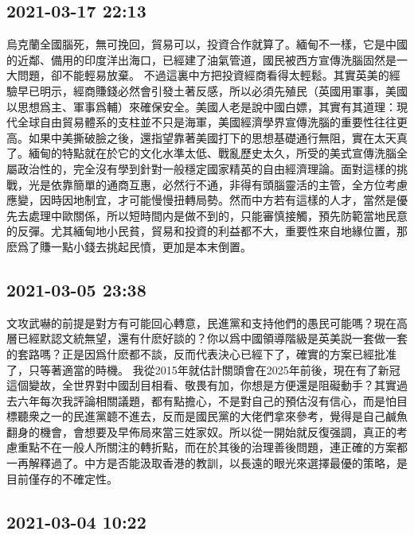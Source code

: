 \documentclass[twocolumn]{ctexart}
\begin{document}
\subsection*{2021-03-17 22:13}

烏克蘭全國腦死，無可挽回，貿易可以，投資合作就算了。緬甸不一樣，它是中國的近鄰、備用的印度洋出海口，已經建了油氣管道，國民被西方宣傳洗腦固然是一大問題，卻不能輕易放棄。
不過這裏中方把投資經商看得太輕鬆。其實英美的經驗早已明示，經商賺錢必然會引發土著反感，所以必須先殖民（英國用軍事，美國以思想爲主、軍事爲輔）來確保安全。美國人老是說中國白嫖，其實有其道理：現代全球自由貿易體系的支柱並不只是海軍，美國經濟學界宣傳洗腦的重要性往往更高。如果中美撕破臉之後，還指望靠著美國打下的思想基礎通行無阻，實在太天真了。緬甸的特點就在於它的文化水準太低、戰亂歷史太久，所受的美式宣傳洗腦全屬政治性的，完全沒有學到針對一般穩定國家精英的自由經濟理論。面對這樣的挑戰，光是依靠簡單的通商互惠，必然行不通，非得有頭腦靈活的主管，全方位考慮應變，因時因地制宜，才可能慢慢扭轉局勢。然而中方若有這樣的人才，當然是優先去處理中歐關係，所以短時間内是做不到的，只能審慎接觸，預先防範當地民意的反彈。尤其緬甸地小民貧，貿易和投資的利益都不大，重要性來自地緣位置，那麽爲了賺一點小錢去挑起民憤，更加是本末倒置。
\subsection*{2021-03-05 23:38}

文攻武嚇的前提是對方有可能回心轉意，民進黨和支持他們的愚民可能嗎？現在高層已經默認文統無望，還有什麽好談的？你以爲中國領導階級是英美説一套做一套的套路嗎？正是因爲什麽都不談，反而代表決心已經下了，確實的方案已經批准了，只等著適當的時機。
我從2015年就估計關頭會在2025年前後，現在有了新冠這個變故，全世界對中國刮目相看、敬畏有加，你想是方便還是阻礙動手？其實過去六年每次我評論相關議題，都有點擔心，不是對自己的預估沒有信心，而是怕目標聽衆之一的民進黨聼不進去，反而是國民黨的大佬們拿來參考，覺得是自己鹹魚翻身的機會，會想要及早佈局來當三姓家奴。所以從一開始就反復强調，真正的考慮重點不在一般人所關注的轉折點，而在於其後的治理善後問題，連正確的方案都一再解釋過了。中方是否能汲取香港的教訓，以長遠的眼光來選擇最優的策略，是目前僅存的不確定性。
\subsection*{2021-03-04 10:22}
\end{document}
